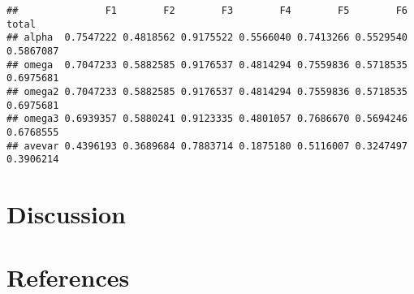 \documentclass[
  english,
  man]{apa6}
\begin{document}
\begin{verbatim}
##               F1        F2        F3        F4        F5        F6     total
## alpha  0.7547222 0.4818562 0.9175522 0.5566040 0.7413266 0.5529540 0.5867087
## omega  0.7047233 0.5882585 0.9176537 0.4814294 0.7559836 0.5718535 0.6975681
## omega2 0.7047233 0.5882585 0.9176537 0.4814294 0.7559836 0.5718535 0.6975681
## omega3 0.6939357 0.5880241 0.9123335 0.4801057 0.7686670 0.5694246 0.6768555
## avevar 0.4396193 0.3689684 0.7883714 0.1875180 0.5116007 0.3247497 0.3906214
\end{verbatim}

\hypertarget{discussion}{%
\section{Discussion}\label{discussion}}

\newpage

\hypertarget{references}{%
\section{References}\label{references}}

\begingroup
\setlength{\parindent}{-0.5in}
\setlength{\leftskip}{0.5in}
\end{document}
